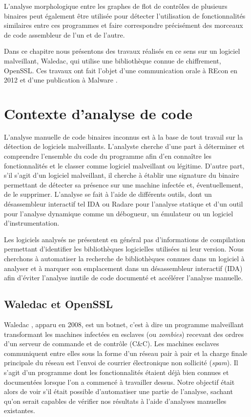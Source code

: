 L'analyse morphologique entre les graphes de flot de contrôles de plusieurs binaires peut également être utilisée pour détecter l'utilisation de fonctionnalités similaires entre ces programmes et faire correspondre précisément des morceaux de code assembleur de l'un et de l'autre.

Dans ce chapitre nous présentons des travaux réalisés en ce sens sur un logiciel malveillant, Waledac, qui utilise une bibliothèque connue de chiffrement, OpenSSL.
Ces travaux ont fait l'objet d'une communication orale à REcon en 2012 \cite{REAT12} et d'une publication à Malware \cite{mal12}.

\section{Contexte d'analyse de code}
L'analyse manuelle de code binaires inconnus est à la base de tout travail sur la détection de logiciels malveillants.
L'analyste cherche d'une part à déterminer et comprendre l'ensemble du code du programme afin d'en connaître les fonctionnalités
et le classer comme logiciel malveillant ou légitime.
D'autre part, s'il s'agit d'un logiciel malveillant, il cherche à établir une signature du binaire permettant de détecter sa présence sur une machine infectée et, éventuellement, de le supprimer.
L'analyse se fait à l'aide de différents outils, dont un désassembleur interactif tel IDA \cite{IDA} ou Radare \cite{radare} pour l'analyse statique et d'un outil pour l'analyse dynamique comme un débogueur, un émulateur ou un logiciel d'instrumentation.

Les logiciels analysés ne présentent en général pas d'informations de compilation permettant d'identifier les bibliothèques logicielles utilisées ni leur version. Nous cherchons à automatiser la recherche de bibliothèques connues dans un logiciel à analyser et à marquer son emplacement dans un désassembleur interactif (IDA) afin d'éviter l'analyse inutile de code documenté et accélérer l'analyse manuelle.

\subsection{Waledac et OpenSSL}
Waledac \cite{CRFLSGBA10}, apparu en 2008, est un botnet, c'est à dire un programme malveillant transformant les machines infectées en esclaves (ou \emph{zombies}) recevant des ordres d'un serveur de commande et de contrôle (C\&C).
Les machines esclaves communiquent entre elles sous la forme d'un réseau pair à pair et la charge finale principale du réseau est l'envoi de courrier électronique non sollicité (\emph{spam}).
Il s'agit d'un programme dont les fonctionnalités étaient déjà bien connues et documentées lorsque l'on a commencé à travailler dessus. Notre objectif était alors de voir s'il était possible d'automatiser une partie de l'analyse, sachant qu'on serait capables de vérifier nos résultats à l'aide d'analyses manuelles existantes.

